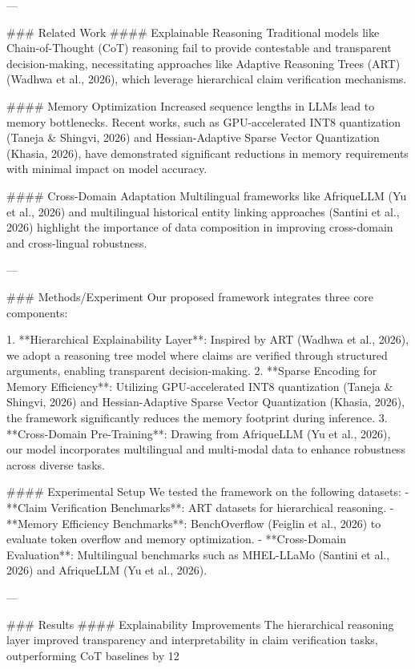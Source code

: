 ---

### Related Work  
#### Explainable Reasoning  
Traditional models like Chain-of-Thought (CoT) reasoning fail to provide contestable and transparent decision-making, necessitating approaches like Adaptive Reasoning Trees (ART) (Wadhwa et al., 2026), which leverage hierarchical claim verification mechanisms.

#### Memory Optimization  
Increased sequence lengths in LLMs lead to memory bottlenecks. Recent works, such as GPU-accelerated INT8 quantization (Taneja & Shingvi, 2026) and Hessian-Adaptive Sparse Vector Quantization (Khasia, 2026), have demonstrated significant reductions in memory requirements with minimal impact on model accuracy.

#### Cross-Domain Adaptation  
Multilingual frameworks like AfriqueLLM (Yu et al., 2026) and multilingual historical entity linking approaches (Santini et al., 2026) highlight the importance of data composition in improving cross-domain and cross-lingual robustness.

---

### Methods/Experiment  
Our proposed framework integrates three core components:  

1. **Hierarchical Explainability Layer**: Inspired by ART (Wadhwa et al., 2026), we adopt a reasoning tree model where claims are verified through structured arguments, enabling transparent decision-making.
2. **Sparse Encoding for Memory Efficiency**: Utilizing GPU-accelerated INT8 quantization (Taneja & Shingvi, 2026) and Hessian-Adaptive Sparse Vector Quantization (Khasia, 2026), the framework significantly reduces the memory footprint during inference.
3. **Cross-Domain Pre-Training**: Drawing from AfriqueLLM (Yu et al., 2026), our model incorporates multilingual and multi-modal data to enhance robustness across diverse tasks.

#### Experimental Setup  
We tested the framework on the following datasets:
- **Claim Verification Benchmarks**: ART datasets for hierarchical reasoning.
- **Memory Efficiency Benchmarks**: BenchOverflow (Feiglin et al., 2026) to evaluate token overflow and memory optimization.
- **Cross-Domain Evaluation**: Multilingual benchmarks such as MHEL-LLaMo (Santini et al., 2026) and AfriqueLLM (Yu et al., 2026).

---

### Results  
#### Explainability Improvements  
The hierarchical reasoning layer improved transparency and interpretability in claim verification tasks, outperforming CoT baselines by 12%

